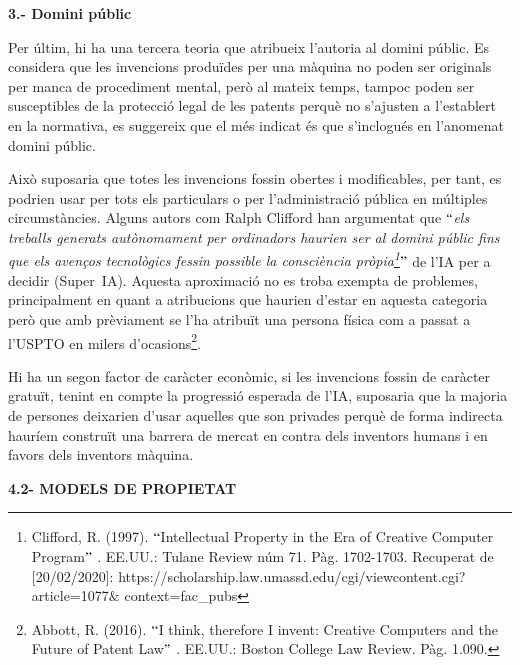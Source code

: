 \documentclass[12pt]{article}
\begin{document}
\vspace{\baselineskip}
\textbf{3.- Domini públic}\par


\vspace{\baselineskip}
Per últim, hi ha una tercera teoria que atribueix l’autoria al domini públic. Es considera que les invencions produïdes per una màquina no poden ser originals per manca de procediment mental, però al mateix temps, tampoc poden ser susceptibles de la protecció legal de les patents perquè no s’ajusten a l’establert en la normativa, es suggereix que el més indicat és que s’inclogués en l’anomenat domini públic. \par


\vspace{\baselineskip}
Això suposaria que totes les invencions fossin obertes i modificables, per tant, es podrien usar per tots els particulars o per l’administració pública en múltiples circumstàncies. Alguns autors com Ralph Clifford han argumentat que $``$\textit{els treballs generats autònomament per ordinadors haurien ser al domini públic fins que els avenços tecnològics fessin possible la consciència pròpia\footnote{ Clifford, R. (1997). $``$Intellectual Property in the Era of Creative Computer Program$"$ . EE.UU.: Tulane Review núm 71. Pàg. 1702-1703. Recuperat de [20/02/2020]: https://scholarship.law.umassd.edu/cgi/viewcontent.cgi?article=1077$\&$ context=fac\_pubs }$"$  }de l’IA per a decidir (Super\ IA).  Aquesta aproximació no es troba exempta de problemes, principalment en quant a atribucions que haurien d’estar en aquesta categoria però que amb prèviament se l’ha atribuït una persona física com a passat a l’USPTO en milers d’ocasions\footnote{Abbott, R. (2016). $``$I think, therefore I invent: Creative Computers and the Future of Patent Law$"$ . EE.UU.: Boston College Law Review. Pàg. 1.090. }. \par

Hi ha un segon factor de caràcter econòmic, si les invencions fossin de caràcter gratuït, tenint en compte la progressió esperada de l’IA, suposaria que la majoria de persones deixarien d’usar aquelles que son privades perquè de forma indirecta hauríem construït una barrera de mercat en contra dels inventors humans i en favors dels inventors màquina.\par


\vspace{\baselineskip}
\begin{justify}
\textbf{4.2- MODELS DE PROPIETAT}
\end{justify}\par
\end{document}
